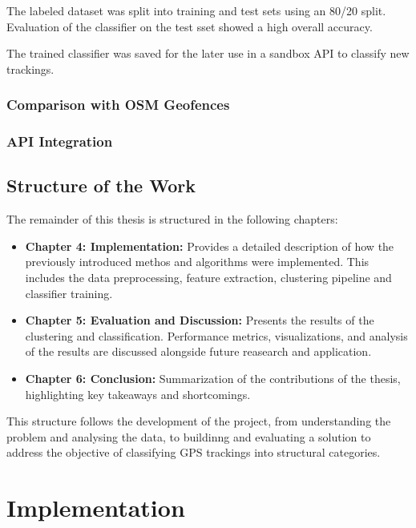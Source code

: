 \documentclass[a4paper,12pt,twoside]{scrreprt}
\begin{document}
The labeled dataset was split into training and test sets using an 80/20 split.
Evaluation of the classifier on the test sset showed a high overall accuracy.

The trained classifier was saved for the later use in a sandbox API to classify
new trackings.

\subsection{Comparison with OSM Geofences}

\subsection{API Integration}

\section{Structure of the Work}

The remainder of this thesis is structured in the following chapters:

\begin{itemize}
  \item \textbf{Chapter 4: Implementation:} Provides a detailed description of
        how the previously introduced methos and algorithms were implemented.
        This
        includes the data preprocessing, feature extraction, clustering
        pipeline and
        classifier training.
  \item \textbf{Chapter 5: Evaluation and Discussion:} Presents the results of
        the clustering and classification. Performance metrics, visualizations,
        and
        analysis of the results are discussed alongside future reasearch and
        application.
  \item \textbf{Chapter 6: Conclusion:} Summarization of the contributions of
        the thesis, highlighting key takeaways and shortcomings.
\end{itemize}

This structure follows the development of the project, from understanding the
problem and analysing the data, to buildinng and evaluating a solution to
address the objective of classifying GPS trackings into structural categories.
\chapter{Implementation}
\end{document}
